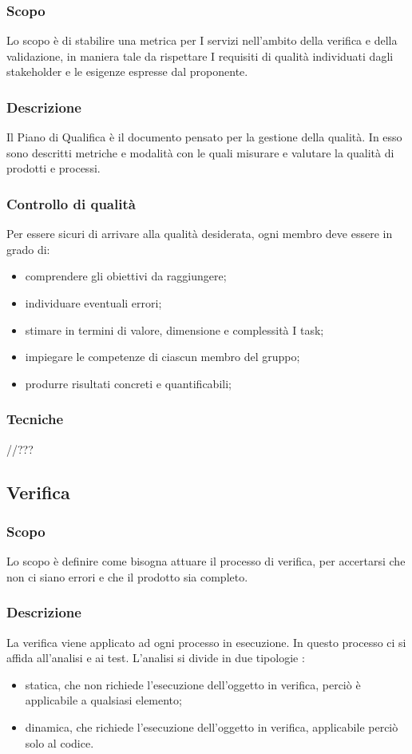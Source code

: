 \subsubsection{Scopo}
Lo scopo è di stabilire una metrica per I servizi nell’ambito della verifica e della validazione, in maniera tale da rispettare I requisiti di qualità individuati dagli stakeholder e le esigenze espresse dal proponente.

\subsubsection{Descrizione}
Il Piano di Qualifica è il documento pensato per la gestione della qualità. In esso sono descritti metriche e modalità con le quali misurare e valutare la qualità di prodotti e processi.  

\subsubsection{Controllo di qualità}
Per essere sicuri di arrivare alla qualità desiderata, ogni membro deve essere in grado di:
\begin{itemize}
\item comprendere gli obiettivi da raggiungere;
\item individuare eventuali errori;
\item stimare in termini di valore, dimensione e complessità I task;
\item impiegare le competenze di ciascun membro del gruppo;
\item produrre risultati concreti e quantificabili;

\end{itemize}
\subsubsection{Tecniche}
//???


\subsection{Verifica}
\subsubsection{Scopo}
Lo scopo è definire come bisogna attuare il processo di verifica, per accertarsi che non ci siano errori e che il prodotto sia completo.

\subsubsection{Descrizione}
La verifica viene applicato ad ogni processo in esecuzione. In questo processo ci si affida all’analisi e ai test. L’analisi si divide in due tipologie :
\begin{itemize}
\item statica, che non richiede l’esecuzione dell’oggetto in verifica, perciò è applicabile a qualsiasi elemento;
\item dinamica, che richiede l’esecuzione dell’oggetto in verifica, applicabile perciò solo al codice.
\end{itemize}

